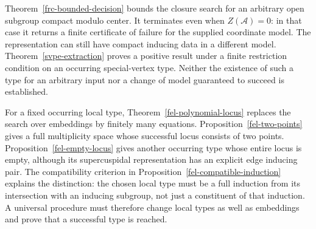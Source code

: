 \documentclass[10pt]{amsart}
\begin{document}
Theorem~\ref{frc-bounded-decision} bounds the closure search for an arbitrary
open subgroup compact modulo center. It terminates even when
$Z(\mathcal A)=0$: in that case it returns a finite certificate of failure
for the supplied coordinate model. The representation can still have
compact inducing data in a different model. Theorem~\ref{svpe-extraction}
proves a positive result under a finite restriction condition on an
occurring special-vertex type. Neither the existence of such a type for an
arbitrary input nor a change of model guaranteed to succeed is established.

For a fixed occurring local type, Theorem~\ref{fel-polynomial-locus}
replaces the search over embeddings by finitely many equations.
Proposition~\ref{fel-two-points} gives a full multiplicity space whose
successful locus consists of two points. Proposition~\ref{fel-empty-locus}
gives another occurring type whose entire locus is empty, although its
supercuspidal representation has an explicit edge inducing pair. The
compatibility criterion in Proposition~\ref{fel-compatible-induction}
explains the distinction: the chosen local type must be a full induction
from its intersection with an inducing subgroup, not just a constituent
of that induction. A universal procedure must therefore change local
types as well as embeddings and prove that a successful type is reached.
\end{document}
